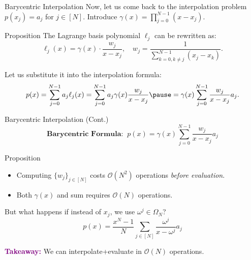 \documentclass{zkdl-presentation-template}
\begin{document}
    \begin{frame}{Barycentric Interpolation}
        Now, let us come back to the interpolation problem $p(x_j) = a_j$ for $j \in [N]$.
        Introduce $\gamma(x) = \prod_{j=0}^{N-1}(x-x_j)$. \pause

        \begin{block}{Proposition}
            The Lagrange basis polynomial $\ell_j$ can be rewritten as:
            \begin{equation*}
                \ell_j(x) = \gamma(x) \cdot \frac{w_j}{x-x_j}, \quad w_j = \frac{1}{\sum_{k=0,k\neq j}^{N-1}(x_j-x_k)}.
            \end{equation*}
        \end{block}

        \pause Let us substitute it into the interpolation formula:
        \begin{equation*}
            p(x) = \sum_{j=0}^{N-1}a_j\ell_j(x) = \sum_{j=0}^{N-1}a_j\gamma(x)\frac{w_j}{x-x_j} \pause = \gamma(x)\sum_{j=0}^{N-1}\frac{w_j}{x-x_j}a_j.
        \end{equation*}
    \end{frame}

    \begin{frame}{Barycentric Interpolation (Cont.)}
        \begin{equation*}
            \boxed{\textbf{Barycentric Formula:} \; \; p(x) = \gamma(x)\sum_{j=0}^{N-1}\frac{w_j}{x-x_j}a_j}
        \end{equation*}

        \pause\begin{alertblock}{Proposition}
            \begin{itemize}
                \item Computing $\{w_j\}_{j \in [N]}$ costs $\mathcal{O}(N^2)$
                operations \emph{before evaluation}.\pause
                \item Both $\gamma(x)$ and sum requires $\mathcal{O}(N)$ operations.\pause
            \end{itemize}
        \end{alertblock}

        But what happens if instead of $x_j$, we use $\omega^j \in \Omega_N$?\pause
        \begin{equation*}
            \boxed{p(x) = \frac{x^N-1}{N}\sum_{j \in [N]}\frac{\omega^j}{x-\omega^j}a_j}
        \end{equation*}

        \pause\textcolor{purple}{\textbf{Takeaway:}} We can interpolate+evaluate in $\mathcal{O}(N)$ operations.
    \end{frame}
\end{document}
